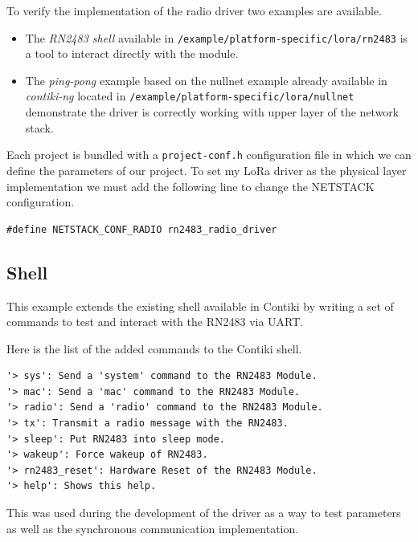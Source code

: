 To verify the implementation of the radio driver two examples are available.

\begin{itemize}
  \item The \emph{RN2483 shell} available in
    \lstinline{/example/platform-specific/lora/rn2483} is a tool to interact
    directly with the module.
  \item The \emph{ping-pong} example based on the nullnet example already
    available in \emph{contiki-ng} located in 
    \lstinline{/example/platform-specific/lora/nullnet} demonstrate the driver
    is correctly working with upper layer of the network stack.
\end{itemize}

Each project is bundled with a \lstinline{project-conf.h}
configuration file in which we can define the parameters of our project. 
To set my LoRa driver as the physical layer implementation we must add the
following line to change the NETSTACK configuration.

\begin{lstlisting}
#define NETSTACK_CONF_RADIO rn2483_radio_driver
\end{lstlisting}

\subsection{Shell}

This example extends the existing shell available in Contiki by writing a set
of commands to test and interact with the RN2483 via UART\@.

Here is the list of the added commands to the Contiki shell.

\begin{lstlisting}
'> sys': Send a 'system' command to the RN2483 Module.
'> mac': Send a 'mac' command to the RN2483 Module.
'> radio': Send a 'radio' command to the RN2483 Module.
'> tx': Transmit a radio message with the RN2483.
'> sleep': Put RN2483 into sleep mode.
'> wakeup': Force wakeup of RN2483.
'> rn2483_reset': Hardware Reset of the RN2483 Module.
'> help': Shows this help.
\end{lstlisting}

This was used during the development of the driver as a way to test parameters
as well as the synchronous communication implementation.

